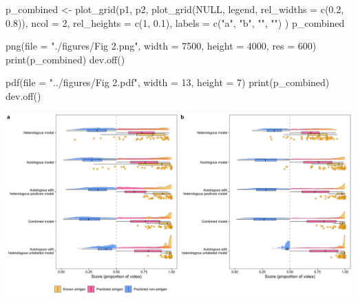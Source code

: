 \documentclass[
  11pt,
  oneside]{book}
\newenvironment{Shaded}{\begin{snugshade}}{\end{snugshade}}
\newcommand{\AttributeTok}[1]{\textcolor[rgb]{0.77,0.63,0.00}{#1}}
\newcommand{\ConstantTok}[1]{\textcolor[rgb]{0.00,0.00,0.00}{#1}}
\newcommand{\DecValTok}[1]{\textcolor[rgb]{0.00,0.00,0.81}{#1}}
\newcommand{\FloatTok}[1]{\textcolor[rgb]{0.00,0.00,0.81}{#1}}
\newcommand{\FunctionTok}[1]{\textcolor[rgb]{0.00,0.00,0.00}{#1}}
\newcommand{\NormalTok}[1]{#1}
\newcommand{\OtherTok}[1]{\textcolor[rgb]{0.56,0.35,0.01}{#1}}
\newcommand{\StringTok}[1]{\textcolor[rgb]{0.31,0.60,0.02}{#1}}
\begin{document}
\begin{Shaded}
\begin{Highlighting}[]
\NormalTok{p\_combined }\OtherTok{\textless{}{-}} \FunctionTok{plot\_grid}\NormalTok{(p1, p2, }\FunctionTok{plot\_grid}\NormalTok{(}\ConstantTok{NULL}\NormalTok{, legend, }\AttributeTok{rel\_widths =} \FunctionTok{c}\NormalTok{(}\FloatTok{0.2}\NormalTok{, }\FloatTok{0.8}\NormalTok{)),}
  \AttributeTok{ncol =} \DecValTok{2}\NormalTok{,}
  \AttributeTok{rel\_heights =} \FunctionTok{c}\NormalTok{(}\DecValTok{1}\NormalTok{, }\FloatTok{0.1}\NormalTok{), }\AttributeTok{labels =} \FunctionTok{c}\NormalTok{(}\StringTok{"a"}\NormalTok{, }\StringTok{"b"}\NormalTok{, }\StringTok{""}\NormalTok{, }\StringTok{""}\NormalTok{)}
\NormalTok{)}
\NormalTok{p\_combined}
\end{Highlighting}
\end{Shaded}

\begin{Shaded}
\begin{Highlighting}[]
\FunctionTok{png}\NormalTok{(}\AttributeTok{file =} \StringTok{"./figures/Fig 2.png"}\NormalTok{, }\AttributeTok{width =} \DecValTok{7500}\NormalTok{, }\AttributeTok{height =} \DecValTok{4000}\NormalTok{, }\AttributeTok{res =} \DecValTok{600}\NormalTok{)}
\FunctionTok{print}\NormalTok{(p\_combined)}
\FunctionTok{dev.off}\NormalTok{()}

\FunctionTok{pdf}\NormalTok{(}\AttributeTok{file =} \StringTok{"../figures/Fig 2.pdf"}\NormalTok{, }\AttributeTok{width =} \DecValTok{13}\NormalTok{, }\AttributeTok{height =} \DecValTok{7}\NormalTok{)}
\FunctionTok{print}\NormalTok{(p\_combined)}
\FunctionTok{dev.off}\NormalTok{()}
\end{Highlighting}
\end{Shaded}

\begin{center}\includegraphics[width=1\linewidth]{./figures/Fig 2} \end{center}
\end{document}

